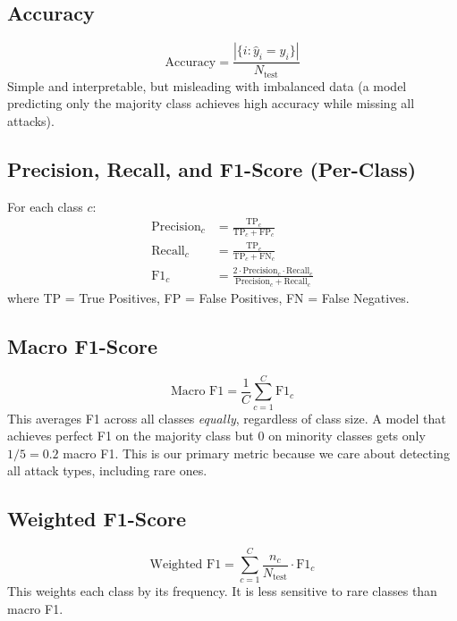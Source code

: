 \documentclass[conference]{IEEEtran}
\begin{document}
\subsection{Accuracy}
\begin{equation}
    \text{Accuracy} = \frac{|\{i : \hat{y}_i = y_i\}|}{N_{\text{test}}}
\end{equation}
Simple and interpretable, but misleading with imbalanced data (a model predicting only the majority class achieves high accuracy while missing all attacks).

\subsection{Precision, Recall, and F1-Score (Per-Class)}

For each class $c$:
\begin{align}
    \text{Precision}_c &= \frac{\text{TP}_c}{\text{TP}_c + \text{FP}_c} \\
    \text{Recall}_c &= \frac{\text{TP}_c}{\text{TP}_c + \text{FN}_c} \\
    \text{F1}_c &= \frac{2 \cdot \text{Precision}_c \cdot \text{Recall}_c}{\text{Precision}_c + \text{Recall}_c}
\end{align}
where TP = True Positives, FP = False Positives, FN = False Negatives.

\subsection{Macro F1-Score}

\begin{equation}
    \text{Macro F1} = \frac{1}{C} \sum_{c=1}^{C} \text{F1}_c
\end{equation}
This averages F1 across all classes \emph{equally}, regardless of class size. A model that achieves perfect F1 on the majority class but 0 on minority classes gets only $1/5 = 0.2$ macro F1. This is our primary metric because we care about detecting all attack types, including rare ones.

\subsection{Weighted F1-Score}

\begin{equation}
    \text{Weighted F1} = \sum_{c=1}^{C} \frac{n_c}{N_{\text{test}}} \cdot \text{F1}_c
\end{equation}
This weights each class by its frequency. It is less sensitive to rare classes than macro F1.
\end{document}
